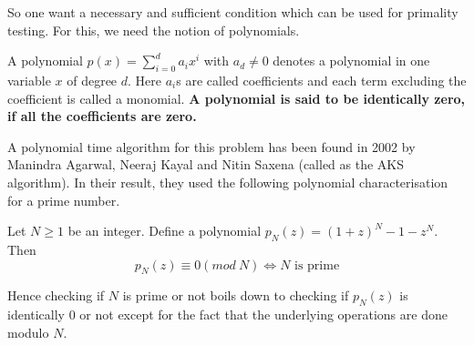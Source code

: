 So one want a necessary and sufficient condition which can be used for
primality testing. For this, we need the notion of polynomials.
\begin{definition}
	A polynomial $p(x) = \sum_{i=0}^d a_ix^i$ with $a_d \ne 0$ denotes a
	polynomial in one variable $x$ of degree $d$. Here $a_i$s are called
	coefficients and each term excluding the coefficient is called a
	monomial. \textbf{A polynomial is said to be identically zero, if all
	the coefficients are zero.}
\end{definition}

A polynomial time algorithm for this problem has been found in 2002 by
Manindra Agarwal, Neeraj Kayal and Nitin Saxena (called as the AKS algorithm). 
In their result, they used the following polynomial characterisation for a
prime number.
\begin{theorem} Let $N \ge 1$ be
	an integer. Define a polynomial 
	$p_N(z) = (1+z)^N - 1 - z^N$. Then \[ p_N(z) \equiv 0 (mod~ N)
	\iff N \text{ is prime} \]
\end{theorem}

Hence checking if $N$ is prime or not boils down to checking if $p_N(z)$ is
identically $0$ or not except for the fact that the underlying operations are
done modulo $N$.

